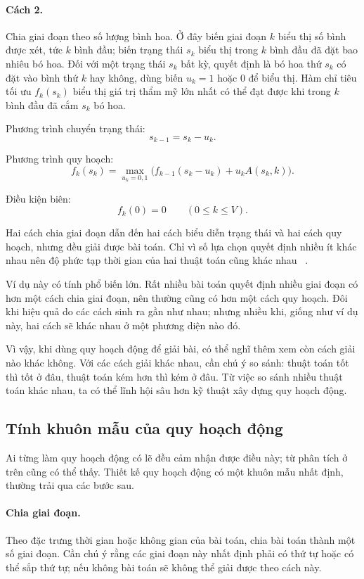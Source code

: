 \documentclass[11pt]{article}
\begin{document}
\paragraph{Cách 2.}
Chia giai đoạn theo số lượng bình hoa. Ở đây biến giai đoạn \(k\) biểu thị số
bình được xét, tức \(k\) bình đầu; biến trạng thái \(s_k\) biểu thị trong
\(k\) bình đầu đã đặt bao nhiêu bó hoa. Đối với một trạng thái \(s_k\) bất
kỳ, quyết định là bó hoa thứ \(s_k\) có đặt vào bình thứ \(k\) hay không,
dùng biến \(u_k=1\) hoặc \(0\) để biểu thị. Hàm chỉ tiêu tối ưu \(f_k(s_k)\)
biểu thị giá trị thẩm mỹ lớn nhất có thể đạt được khi trong \(k\) bình đầu đã
cắm \(s_k\) bó hoa.

Phương trình chuyển trạng thái:
\[
  s_{k-1}=s_k-u_k.
\]

Phương trình quy hoạch:
\[
  f_k(s_k)=
  \max_{u_k=0,1}\bigl(f_{k-1}(s_k-u_k)+u_k A(s_k,k)\bigr).
\]

Điều kiện biên:
\[
  f_k(0)=0\qquad (0\le k\le V).
\]

Hai cách chia giai đoạn dẫn đến hai cách biểu diễn trạng thái và hai cách quy
hoạch, nhưng đều giải được bài toán. Chỉ vì số lựa chọn quyết định nhiều ít
khác nhau nên độ phức tạp thời gian của hai thuật toán cũng khác nhau
~\cite{flower-report}.

Ví dụ này có tính phổ biến lớn. Rất nhiều bài toán quyết định nhiều giai đoạn
có hơn một cách chia giai đoạn, nên thường cũng có hơn một cách quy hoạch.
Đôi khi hiệu quả do các cách sinh ra gần như nhau; nhưng nhiều khi, giống như
ví dụ này, hai cách sẽ khác nhau ở một phương diện nào đó.

Vì vậy, khi dùng quy hoạch động để giải bài, có thể nghĩ thêm xem còn cách
giải nào khác không. Với các cách giải khác nhau, cần chú ý so sánh: thuật
toán tốt thì tốt ở đâu, thuật toán kém hơn thì kém ở đâu. Từ việc so sánh
nhiều thuật toán khác nhau, ta có thể lĩnh hội sâu hơn kỹ thuật xây dựng quy
hoạch động.

\subsection{Tính khuôn mẫu của quy hoạch động}

Ai từng làm quy hoạch động có lẽ đều cảm nhận được điều này; từ phân tích ở
trên cũng có thể thấy. Thiết kế quy hoạch động có một khuôn mẫu nhất định,
thường trải qua các bước sau.

\paragraph{Chia giai đoạn.}
Theo đặc trưng thời gian hoặc không gian của bài toán, chia bài toán thành
một số giai đoạn. Cần chú ý rằng các giai đoạn này nhất định phải có thứ tự
hoặc có thể sắp thứ tự; nếu không bài toán sẽ không thể giải được theo cách
này.
\end{document}
